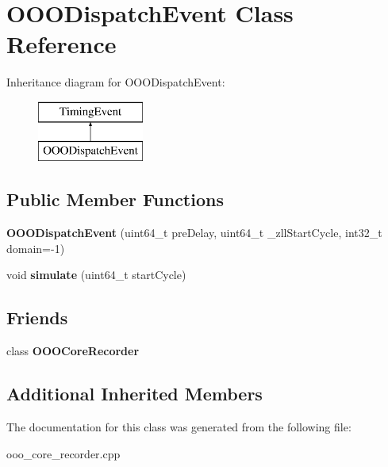 \hypertarget{classOOODispatchEvent}{\section{O\-O\-O\-Dispatch\-Event Class Reference}
\label{classOOODispatchEvent}
}
Inheritance diagram for O\-O\-O\-Dispatch\-Event\-:\begin{figure}[H]
\begin{center}
\leavevmode
\includegraphics[height=2.000000cm]{classOOODispatchEvent}
\end{center}
\end{figure}
\subsection*{Public Member Functions}
\begin{DoxyCompactItemize}
\item 
\hypertarget{classOOODispatchEvent_acf0ff41bc3c46f659422e95fe1af424c}{{\bfseries O\-O\-O\-Dispatch\-Event} (uint64\-\_\-t pre\-Delay, uint64\-\_\-t \-\_\-zll\-Start\-Cycle, int32\-\_\-t domain=-\/1)}\label{classOOODispatchEvent_acf0ff41bc3c46f659422e95fe1af424c}

\item 
\hypertarget{classOOODispatchEvent_a15215c9212225accdd1b61ef01067d12}{void {\bfseries simulate} (uint64\-\_\-t start\-Cycle)}\label{classOOODispatchEvent_a15215c9212225accdd1b61ef01067d12}

\end{DoxyCompactItemize}
\subsection*{Friends}
\begin{DoxyCompactItemize}
\item 
\hypertarget{classOOODispatchEvent_a37611ab84823dbefbe11233ca80682d0}{class {\bfseries O\-O\-O\-Core\-Recorder}}\label{classOOODispatchEvent_a37611ab84823dbefbe11233ca80682d0}

\end{DoxyCompactItemize}
\subsection*{Additional Inherited Members}


The documentation for this class was generated from the following file\-:\begin{DoxyCompactItemize}
\item 
ooo\-\_\-core\-\_\-recorder.\-cpp\end{DoxyCompactItemize}
